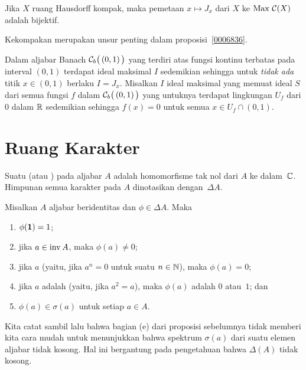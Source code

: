 \begin{cor} Jika $X$ ruang Hausdorff kompak, maka pemetaan $x \mapsto J_x$ dari $X$ ke
$\operatorname{Max}\,\mathcal{C}(X)$ adalah bijektif.
\end{cor}

Kekompakan merupakan unsur penting dalam proposisi~\ref{0006836}.

\begin{exam} Dalam aljabar Banach $\mathcal{C}_b\bigl(\,(0,1)\,\bigr)$ yang terdiri atas fungsi kontinu
terbatas pada interval $(0,1)$ terdapat ideal maksimal $I$ sedemikian sehingga untuk
\emph{tidak ada} titik $x \in (0,1)$ berlaku $I = J_x$. Misalkan $I$ ideal maksimal yang memuat
ideal $S$ dari semua fungsi $f$ dalam $\mathcal{C}_b\bigl(\,(0,1)\,\bigr)$ yang untuknya terdapat
lingkungan $U_f$ dari $0$ dalam $\mathbb{R}$ sedemikian sehingga $f(x) = 0$ untuk semua $x \in U_f \cap (0,1)$.
\end{exam}














\section{Ruang Karakter}
\begin{defn} Suatu
 (atau
) pada aljabar $A$ adalah homomorfisme tak nol
dari $A$ ke dalam~$\mathbb{C}$. Himpunan semua karakter pada $A$ dinotasikan
dengan~$\Delta A$.
\end{defn}

\begin{prop}\label{00068511} Misalkan $A$ aljabar beridentitas dan $\phi \in \Delta A$. Maka
 \begin{enumerate}[label=\rm{(\alph*)}]
  \item $\phi(\mathbf{1}) = 1$;
  \item jika $a \in \operatorname{inv} A$, maka $\phi(a) \ne 0$;
  \item jika $a$
   (yaitu, jika $a^n = 0$ untuk suatu $n \in \mathbb{N}$), maka $\phi(a) = 0$;
  \item jika $a$ adalah
   (yaitu, jika $a^2 = a$), maka $\phi(a)$ adalah $0$ atau~$1$; dan
  \item $\phi(a) \in \sigma(a)$ untuk setiap $a \in A$.
 \end{enumerate}
\end{prop}
Kita catat sambil lalu bahwa bagian (e) dari proposisi sebelumnya tidak memberi kita cara mudah
untuk menunjukkan bahwa spektrum $\sigma(a)$ dari suatu elemen aljabar tidak kosong. Hal ini
bergantung pada pengetahuan bahwa $\Delta(A)$ tidak kosong.

